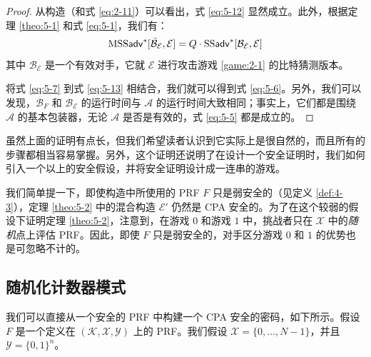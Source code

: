 \begin{proof}
从构造（和式 \ref{eq:2-11}）可以看出，式 \ref{eq:5-12} 显然成立。此外，根据定理 \ref{theo:5-1} 和式 \ref{eq:5-1}，我们有：
\begin{equation}\label{eq:5-13}
{\rm MSS}\mathsf{adv}^*[\mathcal{\bar{B}}_\mathcal{E}, \mathcal{E}]=Q\cdot{\rm SS}\mathsf{adv}^*[\mathcal{B}_\mathcal{E},\mathcal{E}]
\end{equation}
其中 $\mathcal{B}_\mathcal{E}$ 是一个有效对手，它就 $\mathcal{E}$ 进行攻击游戏 \ref{game:2-1} 的比特猜测版本。

将式 \ref{eq:5-7} 到式 \ref{eq:5-13} 相结合，我们就可以得到式 \ref{eq:5-6}。另外，我们可以发现，$\mathcal{B}_F$ 和 $\mathcal{B}_\mathcal{E}$ 的运行时间与 $\mathcal{A}$ 的运行时间大致相同；事实上，它们都是围绕 $\mathcal{A}$ 的基本包装器，无论 $\mathcal{A}$ 是否是有效的，式 \ref{eq:5-5} 都是成立的。
\end{proof}

虽然上面的证明有点长，但我们希望读者认识到它实际上是很自然的，而且所有的步骤都相当容易掌握。另外，这个证明还说明了在设计一个安全证明时，我们如何引入一个以上的安全假设，并将安全证明设计成一连串的游戏。

\begin{remark}\label{remark:5-2}
我们简单提一下，即使构造中所使用的 PRF $F$ 只是弱安全的（见定义 \ref{def:4-3}），定理 \ref{theo:5-2} 中的混合构造 $\mathcal{E}'$ 仍然是 CPA 安全的。为了在这个较弱的假设下证明定理 \ref{theo:5-2}，注意到，在游戏 $0$ 和游戏 $1$ 中，挑战者只在 $\mathcal{X}$ 中的\emph{随机}点上评估 PRF。因此，即使 $F$ 只是弱安全的，对手区分游戏 $0$ 和 $1$ 的优势也是可忽略不计的。
\end{remark}

\subsection{随机化计数器模式}\label{subsec:5-4-2}

我们可以直接从一个安全的 PRF 中构建一个 CPA 安全的密码，如下所示。假设 $F$ 是一个定义在 $(\mathcal{K},\mathcal{X},\mathcal{Y})$ 上的 PRF。我们假设 $\mathcal{X}=\{0,\dots,N-1\}$，并且 $\mathcal{Y}=\{0,1\}^n$。

